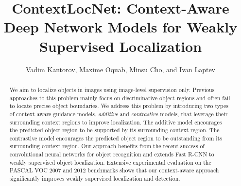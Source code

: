 \documentclass[runningheads]{llncs}
\begin{document}
\newcommand{\etal}{\textit{et al}.}
\newcommand{\ie}{\textit{i}.\textit{e}., }
\newcommand{\eg}{\textit{e}.\textit{g}.}

\pagestyle{headings}
\mainmatter


\def\fixme#1{\textcolor{red}{[#1]}\marginpar{\textcolor{red}{FIXME}}}


\def\checked#1{#1}

\title{ContextLocNet: Context-Aware Deep Network Models for Weakly Supervised Localization} 


\authorrunning{V. Kantorov \etal}

\author{Vadim Kantorov, Maxime Oquab, Minsu Cho, and Ivan Laptev}





\maketitle

\begin{abstract}

We aim to localize objects in images using image-level supervision only.
Previous approaches to this problem mainly focus on discriminative object
regions and often fail to locate precise object boundaries. 
We address this problem by introducing two types of context-aware guidance models, {\em additive
} and {\em contrastive} models, that leverage their surrounding context regions to improve localization. 
The additive model encourages the predicted object region to be
supported by its surrounding context region. 
The contrastive model encourages the
predicted object region to be outstanding from its surrounding context region.
Our approach benefits from the recent success of convolutional neural networks
for object recognition and extends Fast R-CNN to weakly supervised object localization.
Extensive experimental evaluation on the PASCAL VOC 2007 and 2012 benchmarks shows that our context-aware approach significantly improves weakly supervised localization and detection.



 \end{abstract}
\end{document}
